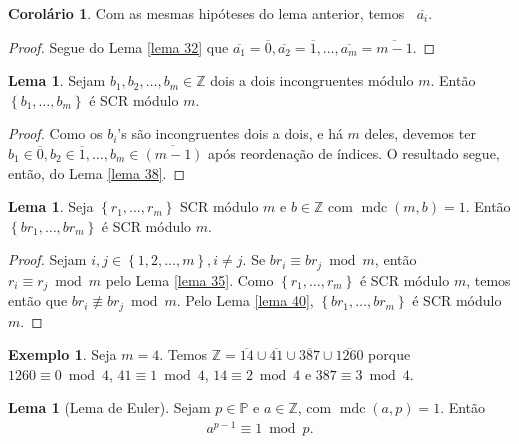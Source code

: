 \documentclass[a4paper,11pt,twoside, leqno]{article}
\DeclareMathOperator{\mdc}{mdc}
\theoremstyle{definition}
\newtheorem{corollary}{Corolário}[theorem]
\newtheorem{lemma}[theorem]{Lema}
\newtheorem*{example}{Exemplo}
\begin{document}
\begin{corollary}
	Com as mesmas hipóteses do lema anterior, temos $\displaystyle{ \mathop{\dot\bigcup_{i=1}^{m}} \overline{a_i} }$.
\end{corollary}
\begin{proof}
	Segue do Lema \eqref{lema 32} que $\overline{a_1} = \overline{0}, \overline{a_2} = \overline{1}, \dots, \overline{a_m} = \overline{m-1}$.
\end{proof}
\begin{lemma}
	\label{lema 40}
	Sejam $b_1, b_2, \dots, b_m\in\mathbb{Z}$ dois a dois incongruentes módulo $m$. Então $\left\{b_1, \dots, b_m\right\}$ é SCR módulo $m$.
\end{lemma}
\begin{proof}
	Como os $b_i$'s são incongruentes dois a dois, e há $m$ deles, devemos ter $b_1\in\overline{0}, b_2\in\overline{1}, \dots, b_m\in\overline{(m-1)}$ após reordenação de índices. O resultado segue, então, do Lema \eqref{lema 38}.
\end{proof}
\begin{lemma}
	\label{lema 41}
	Seja $\left\{r_1, \dots, r_m\right\}$ SCR módulo $m$ e $b\in\mathbb{Z}$ com $\mdc(m,b) = 1$. Então $\left\{br_1, \dots, br_m\right\}$ é SCR módulo $m$.
\end{lemma}
\begin{proof}
	Sejam $i,j\in\left\{1,2,\dots,m\right\}, i\neq j$. Se $br_i\equiv br_j\bmod m$, então $r_i\equiv r_j\bmod m$ pelo Lema \eqref{lema 35}. Como $\left\{r_1, \dots, r_m\right\}$ é SCR módulo $m$, temos então que $br_i\not\equiv br_j\bmod m$. Pelo Lema \eqref{lema 40}, $\left\{br_1, \dots, br_m\right\}$ é SCR módulo $m$.
\end{proof}
\begin{example}
	Seja $m=4$. Temos $\mathbb{Z} = \overline{14}\cup\overline{41}\cup\overline{387}\cup\overline{1260}$ porque $1260\equiv 0\bmod 4$, $41\equiv 1 \bmod 4$, $14\equiv 2\bmod 4$ e $387\equiv 3\bmod 4$.
\end{example}
\begin{lemma}[Lema de Euler]
	\label{lema 42}
	Sejam $p\in\mathbb{P}$ e $a\in\mathbb{Z}$, com $\mdc(a,p) = 1$. Então
	\begin{align*}
	a^{p-1}\equiv 1\bmod p.
	\end{align*}
\end{lemma}
\end{document}
